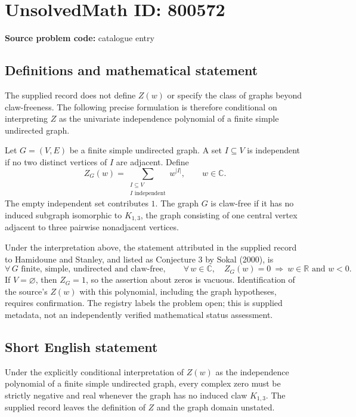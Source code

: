 \documentclass[11pt]{article}
\newcommand{\R}{\mathbb{R}}
\newcommand{\C}{\mathbb{C}}
\begin{document}
\section*{UnsolvedMath ID: 800572}
\textbf{Source problem code:} catalogue entry
\subsection{Definitions and mathematical statement}
The supplied record does not define \(Z(w)\) or specify the class of graphs beyond claw-freeness. The following precise formulation is therefore conditional on interpreting \(Z\) as the univariate independence polynomial of a finite simple undirected graph.

Let \(G=(V,E)\) be a finite simple undirected graph. A set \(I\subseteq V\) is independent if no two distinct vertices of \(I\) are adjacent. Define
\[
Z_G(w)=\sum_{\substack{I\subseteq V\\ I\text{ independent}}}w^{|I|},\qquad w\in\C.
\]
The empty independent set contributes \(1\). The graph \(G\) is claw-free if it has no induced subgraph isomorphic to \(K_{1,3}\), the graph consisting of one central vertex adjacent to three pairwise nonadjacent vertices.

Under the interpretation above, the statement attributed in the supplied record to Hamidoune and Stanley, and listed as Conjecture 3 by Sokal (2000), is
\[
\forall\,G\text{ finite, simple, undirected and claw-free},\qquad
\forall\,w\in\C,\quad Z_G(w)=0\ \Longrightarrow\ w\in\R\text{ and }w<0.
\]
If \(V=\varnothing\), then \(Z_G=1\), so the assertion about zeros is vacuous. Identification of the source's \(Z(w)\) with this polynomial, including the graph hypotheses, requires confirmation. The registry labels the problem open; this is supplied metadata, not an independently verified mathematical status assessment.
\subsection{Short English statement}
Under the explicitly conditional interpretation of \(Z(w)\) as the independence polynomial of a finite simple undirected graph, every complex zero must be strictly negative and real whenever the graph has no induced claw \(K_{1,3}\). The supplied record leaves the definition of \(Z\) and the graph domain unstated.
\end{document}
